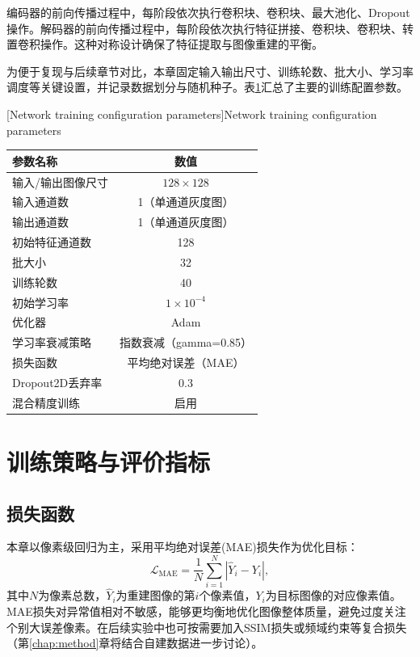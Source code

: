 {编码器的前向传播过程中，每阶段依次执行卷积块、卷积块、最大池化、Dropout操作。解码器的前向传播过程中，每阶段依次执行特征拼接、卷积块、卷积块、转置卷积操作。这种对称设计确保了特征提取与图像重建的平衡。

为便于复现与后续章节对比，本章固定输入输出尺寸、训练轮数、批大小、学习率调度等关键设置，并记录数据划分与随机种子。表\ref{tab:train_config}汇总了主要的训练配置参数。

\begin{table}[!htbp]
    \centering
    [Network training configuration parameters]{\enspace Network training configuration parameters}
    \label{tab:train_config}
    \footnotesize
    \setlength{\tabcolsep}{10pt}
    \renewcommand{\arraystretch}{1.2}
    \begin{tabular}{lc}
        \hline
        参数名称 & 数值 \\
        \hline
        输入/输出图像尺寸 & $128\times 128$ \\
        输入通道数 & 1（单通道灰度图）\\
        输出通道数 & 1（单通道灰度图）\\
        初始特征通道数 & 128 \\
        批大小 & 32 \\
        训练轮数 & 40 \\
        初始学习率 & $1\times 10^{-4}$ \\
        优化器 & Adam \\
        学习率衰减策略 & 指数衰减（gamma=0.85）\\
        损失函数 & 平均绝对误差（MAE）\\
        Dropout2D丢弃率 & 0.3 \\
        混合精度训练 & 启用\\
        \hline
    \end{tabular}
\end{table}

\section{训练策略与评价指标}\label{sec:train_metric}

\subsection{损失函数}\label{sec:loss}

本章以像素级回归为主，采用平均绝对误差(MAE)损失作为优化目标：
\begin{equation}
\mathcal{L}_{\text{MAE}} = \frac{1}{N}\sum_{i=1}^{N}|\hat{Y}_i - Y_i|,
\end{equation}
其中$N$为像素总数，$\hat{Y}_i$为重建图像的第$i$个像素值，$Y_i$为目标图像的对应像素值。MAE损失对异常值相对不敏感，能够更均衡地优化图像整体质量，避免过度关注个别大误差像素。在后续实验中也可按需要加入SSIM损失或频域约束等复合损失（第\ref{chap:method}章将结合自建数据进一步讨论）。

}

